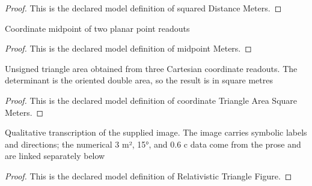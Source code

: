 \begin{proof}
  This is the declared model definition of squared Distance Meters.
\end{proof}
\begin{definition}
  \label{def:physics:phyx-mini-0566:phyxminiproblems-problemphyxmini0566-midpointmeters}
  Coordinate midpoint of two planar point readouts
\end{definition}
\begin{proof}
  This is the declared model definition of midpoint Meters.
\end{proof}
\begin{definition}
  \label{def:physics:phyx-mini-0566:phyxminiproblems-problemphyxmini0566-coordinatetriangleareasquaremeters}
  Unsigned triangle area obtained from three Cartesian coordinate readouts. The determinant is the oriented double area, so the result is in square metres
\end{definition}
\begin{proof}
  This is the declared model definition of coordinate Triangle Area Square Meters.
\end{proof}
\begin{definition}
  \label{def:physics:phyx-mini-0566:phyxminiproblems-problemphyxmini0566-relativistictrianglefigure}
  Qualitative transcription of the supplied image. The image carries symbolic labels and directions; the numerical 3 m², 15°, and 0.6 c data come from the prose and are linked separately below
\end{definition}
\begin{proof}
  This is the declared model definition of Relativistic Triangle Figure.
\end{proof}
